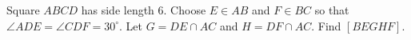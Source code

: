 Square $ABCD$ has side length $6$. Choose $E\in AB$ and $F\in BC$ so that $\angle ADE=\angle CDF=30^\circ$. Let $G=DE\cap AC$ and $H=DF\cap AC$. Find $[BEGHF]$.
